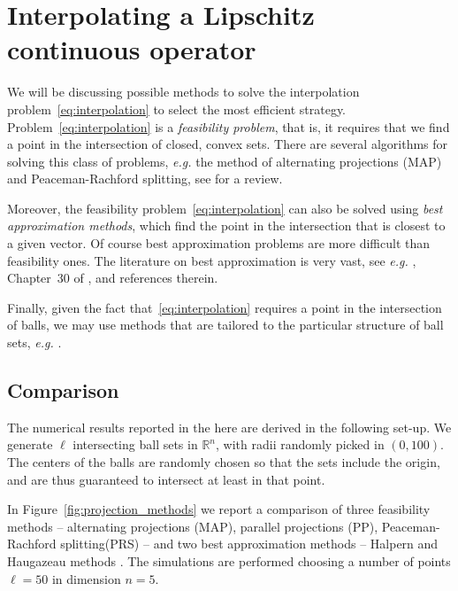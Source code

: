 \documentclass{article}
\newcommand{\R}{\mathbb{R}}
\begin{document}
\section{Interpolating a Lipschitz continuous operator}

We will be discussing possible methods to solve the interpolation problem~\eqref{eq:interpolation} to select the most efficient strategy. Problem~\eqref{eq:interpolation} is a \emph{feasibility problem}, that is, it requires that we find a point in the intersection of closed, convex sets. There are several algorithms for solving this class of problems, \emph{e.g.} the method of alternating projections (MAP) and Peaceman-Rachford splitting, see \cite{reich_projection_2015} for a review.

Moreover, the feasibility problem~\eqref{eq:interpolation} can also be solved using \emph{best approximation methods}, which find the point in the intersection that is closest to a given vector. Of course best approximation problems are more difficult than feasibility ones. The literature on best approximation is very vast, see \emph{e.g.} \cite{reich_projection_2015}, Chapter~30 of \cite{bauschke_convex_2017}, \cite{artacho_new_2018} and references therein.

Finally, given the fact that~\eqref{eq:interpolation} requires a point in the intersection of balls, we may use methods that are tailored to the particular structure of ball sets, \emph{e.g.} \cite{lushchakova_geometric_2020}.

\subsection{Comparison}
The numerical results reported in the here are derived in the following set-up. We generate $\ell$ intersecting ball sets in $\R^n$, with radii randomly picked in $(0, 100)$. The centers of the balls are randomly chosen so that the sets include the origin, and are thus guaranteed to intersect at least in that point.

In Figure~\ref{fig:projection_methods} we report a comparison of three feasibility methods -- alternating projections (MAP), parallel projections (PP), Peaceman-Rachford splitting(PRS) \cite{reich_projection_2015,bauschke_convex_2017} -- and two best approximation methods -- Halpern and Haugazeau methods \cite{bauschke_convex_2017}. The simulations are performed choosing a number of points $\ell = 50$ in dimension $n = 5$.
\end{document}
